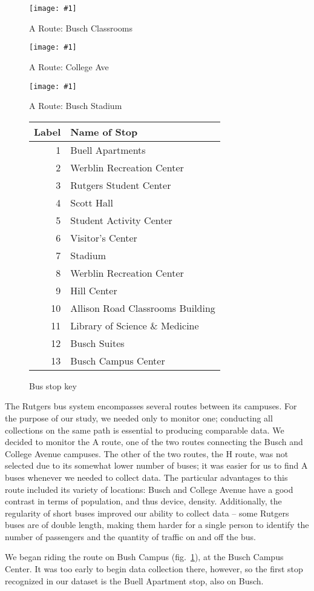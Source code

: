 \documentclass[12pt,journal,compsoc]{IEEEtran} %
\newcommand{\minipic}[3]{
  \begin{figure}[!t]
    \centering
    \texttt{[image: \#1]}
    \caption{#2}
    \label{#3}
  \end{figure}
}
\begin{document}
\minipic{aroutebusch}{A Route: Busch Classrooms} {fig:aroutebusch}
\minipic{aroutecollegeave}{A Route: College Ave}{fig:aroutecollegeave}
\minipic{aroutestadium}{A Route: Busch Stadium}{fig:aroutestadium}

\begin{figure}[!t]
  \centering
  \begin{tabular}{ r|l }
    Label & Name of Stop\\ \hline
    1 & Buell Apartments\\
    2 & Werblin Recreation Center\\
    3 & Rutgers Student Center\\
    4 & Scott Hall\\
    5 & Student Activity Center\\
    6 & Visitor's Center\\
    7 & Stadium\\
    8 & Werblin Recreation Center\\
    9 & Hill Center\\
    10 & Allison Road Classrooms Building\\
    11 & Library of Science \& Medicine\\
    12 & Busch Suites\\
    13 & Busch Campus Center\\
  \end{tabular}
  \caption{Bus stop key}
  \label{fig:stops}
\end{figure}

The Rutgers bus system encompasses several routes between its campuses.
For the purpose of our study, we needed only to monitor one; conducting all collections on the same path is essential to producing comparable data.
We decided to monitor the A route, one of the two routes connecting the Busch and College Avenue campuses.
The other of the two routes, the H route, was not selected due to its somewhat lower number of buses; it was easier for us to find A buses whenever we needed to collect data.
The particular advantages to this route included its variety of locations: Busch and College Avenue have a good contrast in terms of population, and thus device, density.
Additionally, the regularity of short buses improved our ability to collect data -- some Rutgers buses are of double length, making them harder for a single person to identify the number of passengers and the quantity of traffic on and off the bus.

We began riding the route on Bush Campus (fig.~\ref{fig:aroutebusch}), at the Busch Campus Center.
It was too early to begin data collection there, however, so the first stop recognized in our dataset is the Buell Apartment stop, also on Busch.
\end{document}
